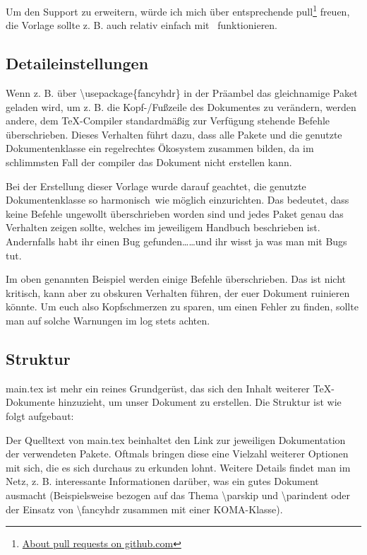 Um den Support zu erweitern, würde ich mich über entsprechende \gls{pull}\footnote{\href{https://help.github.com/en/articles/about-pull-requests}{About pull requests on github.com}} freuen, die Vorlage sollte z. B. auch relativ einfach mit \ funktionieren.%
\subsection{Detaileinstellungen}%
\label{detail-grundl}
Wenn z. B. über \textbackslash usepackage\{fancyhdr\} in der Präambel das gleichnamige Paket geladen wird, um z. B. die Kopf-/Fußzeile des Dokumentes zu verändern, werden andere, dem \TeX{}-Compiler standardmäßig zur Verfügung stehende Befehle überschrieben. Dieses Verhalten führt dazu, dass alle Pakete und die genutzte Dokumentenklasse ein regelrechtes Ökosystem zusammen bilden, da im schlimmsten Fall der \gls{compiler} das Dokument nicht erstellen kann.

Bei der Erstellung dieser Vorlage wurde darauf geachtet, die genutzte Dokumentenklasse so \glqq harmonisch\grqq\ wie möglich einzurichten. Das bedeutet, dass keine Befehle ungewollt überschrieben worden sind und jedes Paket genau das Verhalten zeigen sollte, welches im jeweiligem Handbuch beschrieben ist. Andernfalls habt ihr einen Bug gefunden\dots \dots und ihr wisst ja was man mit Bugs tut.

Im oben genannten Beispiel werden einige Befehle überschrieben. Das ist nicht kritisch, kann aber zu obskuren Verhalten führen, der euer Dokument ruinieren könnte. Um euch also Kopfschmerzen zu sparen, um einen Fehler zu finden, sollte man auf solche Warnungen im log stets achten.%
\subsection{Struktur}%
\label{sec:struct}
main.tex ist mehr ein reines Grundgerüst, das sich den Inhalt weiterer \TeX{}-Dokumente hinzuzieht, um unser Dokument zu erstellen. Die Struktur ist wie folgt aufgebaut:



Der Quelltext von main.tex beinhaltet den Link zur jeweiligen Dokumentation der verwendeten Pakete. Oftmals bringen diese eine Vielzahl weiterer Optionen mit sich, die es sich durchaus zu erkunden lohnt.
Weitere Details findet man im Netz, z. B. interessante Informationen darüber, was ein gutes Dokument ausmacht (Beispielsweise bezogen auf das Thema \textbackslash parskip und \textbackslash parindent oder der Einsatz von \textbackslash fancyhdr zusammen mit einer KOMA-Klasse).%
